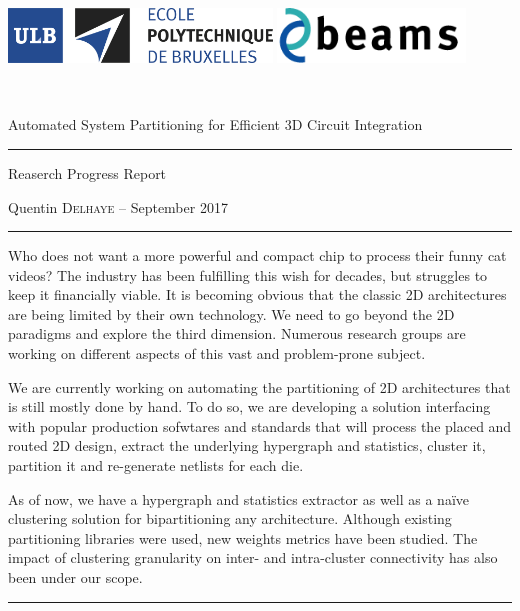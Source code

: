 \documentclass[11pt,a4paper]{report} %
\theoremstyle{customdef}
\renewenvironment{abstract}{%
\begin{center}\begin{minipage}{0.85\textwidth}
\rule{\textwidth}{1pt}}
{\par\noindent\rule{\textwidth}{1pt}\end{minipage}\end{center}}
\begin{document}
\begin{titlepage}
\begin{center}
\includegraphics[width=7cm]{img/logo-polytech-ULB-FR.jpg}
\includegraphics[width=5cm]{img/beams}
\end{center}
~\vspace{5cm}
\begin{center}
 {\LARGE Automated System Partitioning for Efficient 3D Circuit Integration \\ \vspace{.5em} \hrule \vspace{.5em} \Large Reaserch Progress Report\\}
 \vspace{1.5cm}
 {\large Quentin \textsc{Delhaye} -- September 2017}\\[5pt]
 \vspace{3.5cm}

\begin{abstract}
Who does not want a more powerful and compact chip to process their funny cat videos?
The industry has been fulfilling this wish for decades, but struggles to keep it financially viable.
It is becoming obvious that the classic 2D architectures are being limited by their own technology.
We need to go beyond the 2D paradigms and explore the third dimension.
Numerous research groups are working on different aspects of this vast and problem-prone subject.

We are currently working on automating the partitioning of 2D architectures that is still mostly done by hand.
To do so, we are developing a solution interfacing with popular production sofwtares and standards that will process the placed and routed 2D design, extract the underlying hypergraph and statistics, cluster it, partition it and re-generate netlists for each die.

As of now, we have a hypergraph and statistics extractor as well as a naïve clustering solution for bipartitioning any architecture.
Although existing partitioning libraries were used, new weights metrics have been studied.
The impact of clustering granularity on inter- and intra-cluster connectivity has also been under our scope.


\end{abstract}
\end{center}
\end{titlepage}
\end{document}
